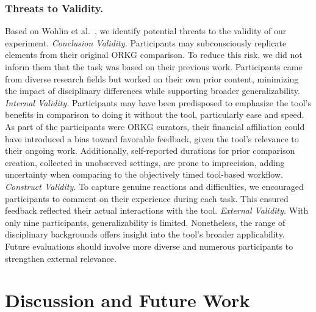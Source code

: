 \documentclass[runningheads]{llncs}
\begin{document}
\subsubsection{Threats to Validity.}
Based on Wohlin et al.~\cite{wohlin_experimentation_2012}, we identify potential threats to the validity of our experiment.
\textit{Conclusion Validity.} Participants may subconsciously replicate elements from their original ORKG comparison. To reduce this risk, we did not inform them that the task was based on their previous work. Participants came from diverse research fields but worked on their own prior content, minimizing the impact of disciplinary differences while supporting broader generalizability.
\textit{Internal Validity.} Participants may have been predisposed to emphasize the tool’s benefits in comparison to doing it without the tool, particularly ease and speed. As part of the participants were ORKG curators, their financial affiliation could have introduced a bias toward favorable feedback, given the tool's relevance to their ongoing work. Additionally, self-reported durations for prior comparison creation, collected in unobserved settings, are prone to imprecision, adding uncertainty when comparing to the objectively timed tool-based workflow.
\textit{Construct Validity.} To capture genuine reactions and difficulties, we encouraged participants to comment on their experience during each task. This ensured feedback reflected their actual interactions with the tool.
\textit{External Validity.} With only nine participants, generalizability is limited. Nonetheless, the range of disciplinary backgrounds offers insight into the tool’s broader applicability. Future evaluations should involve more diverse and numerous participants to strengthen external relevance.

\section{Discussion and Future Work\label{sec:discussion}}
\end{document}
